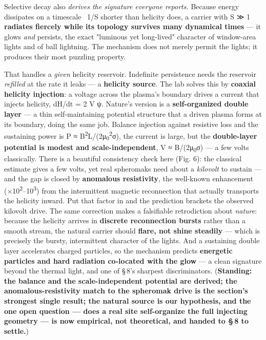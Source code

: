 \documentclass[11pt]{article}
\begin{document}
Selective decay also \emph{derives the signature everyone reports.} Because energy dissipates on a timescale ~1/S shorter than helicity does, a carrier with S ≫ 1 \textbf{radiates fiercely while its topology survives many dynamical times} --- it glows \emph{and} persists, the exact "luminous yet long-lived" character of window-area lights and of ball lightning. The mechanism does not merely permit the lights; it produces their most puzzling property.

That handles a \emph{given} helicity reservoir. Indefinite persistence needs the reservoir \emph{refilled} at the rate it leaks --- a \textbf{helicity source}. The lab solves this by \textbf{coaxial helicity injection}: a voltage across the plasma's boundary drives a current that injects helicity, dH/dt = 2 V ψ. Nature's version is a \textbf{self-organized double layer} --- a thin self-maintaining potential structure that a driven plasma forms at its boundary, doing the same job. Balance injection against resistive loss and the sustaining power is P ≈ B\textsuperscript{2}L/(2μ\textsubscript{0}\textsuperscript{2}σ), the current is large, but the \textbf{double-layer potential is modest and scale-independent}, V ≈ B/(2μ\textsubscript{0}σ) --- a few volts classically. There is a beautiful consistency check here (Fig. 6): the classical estimate gives a few volts, yet real spheromaks need about a \emph{kilovolt} to sustain --- and the gap is closed by \textbf{anomalous resistivity}, the well-known enhancement (×10\textsuperscript{2}--10\textsuperscript{3}) from the intermittent magnetic reconnection that actually transports the helicity inward. Put that factor in and the prediction brackets the observed kilovolt drive. The same correction makes a falsifiable retrodiction about \emph{nature}: because the helicity arrives in \textbf{discrete reconnection bursts} rather than a smooth stream, the natural carrier should \textbf{flare, not shine steadily} --- which is precisely the bursty, intermittent character of the lights. And a sustaining double layer accelerates charged particles, so the mechanism predicts \textbf{energetic particles and hard radiation co-located with the glow} --- a clean signature beyond the thermal light, and one of \S\,8's sharpest discriminators. (\textbf{Standing: the balance and the scale-independent potential are derived; the anomalous-resistivity match to the spheromak drive is the section's strongest single result; the natural source is our hypothesis, and the one open question --- does a real site self-organize the full injecting geometry --- is now empirical, not theoretical, and handed to \S\,8 to settle.})
\end{document}
